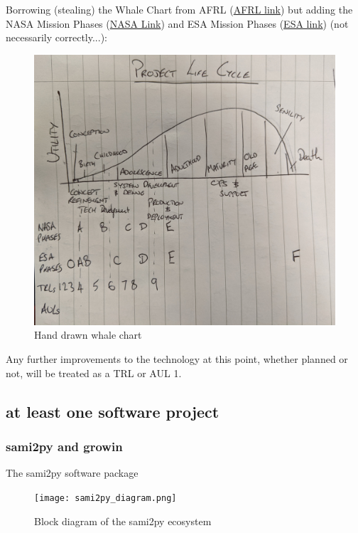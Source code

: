 \documentclass[referee,a4paper,12pt,traditabstract]{swsc}
\begin{document}
\begin{linenumbers}
Borrowing (stealing) the Whale Chart from AFRL (\href{https://smartech.gatech.edu/bitstream/handle/1853/8034/SSEC_SD5_ppt.pdf}{AFRL link}) but adding the NASA Mission Phases (\href{https://solarsystem.nasa.gov/basics/chapter7-1)}{NASA Link}) and ESA Mission Phases (\href{(https://www.space.irfu.se/seminars/20180523-Cripps-HW_Project.pdf}{ESA link}) (not necessarily correctly...):

\begin{figure}[h!t]
    \centering
    \includegraphics[scale=0.1]{whaleChart_hand.jpg}
    \caption{Hand drawn whale chart}
    \label{fig:whaleChart}
\end{figure}


 Any further improvements to the technology at this point, whether planned or not, will be treated as a TRL or AUL 1.

\subsection{at least one software project}
\subsubsection{sami2py and growin}
The sami2py software package \cite{sami2py}
\begin{figure}[h!t]
    \centering
    \texttt{[image: sami2py\_diagram.png]}
    \caption{Block diagram of the sami2py ecosystem}
    \label{fig:whaleChart}
\end{figure}


\end{linenumbers}
\end{document}
